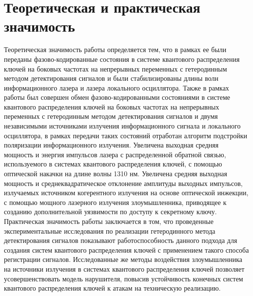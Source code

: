 \section*{Теоретическая и практическая значимость}
Теоретическая значимость работы определяется тем, что в рамках  ее  были переданы фазово-кодированные состояния в системе квантового распределения ключей на боковых частотах на непрерывных переменных с гетеродинным методом детектирования сигналов и были стабилизированы длины волн информационного лазера и лазера локального осциллятора. Также в рамках работы был совершен обмен фазово-кодированными состояниями в системе квантового распределения ключей на боковых частотах на непрерывных переменных с гетеродинным методом детектирования сигналов и двумя независимыми источниками излучения информационного сигнала и локального осциллятора, в рамках передачи таких состояний отработан алгоритм подстройки поляризации информационного излучения. Увеличена выходная средняя мощность и энергия импульсов лазера с распределенной обратной связью, используемого в системах квантового распределения ключей, с помощью оптической накачки на длине волны 1310 нм. Увеличена средняя выходная мощность и среднеквадратическое отклонение амплитуды выходных импульсов, излучаемых источником когерентного излучения на основе оптической инжекции, с помощью мощного лазерного излучения злоумышленника, приводящее к созданию дополнительной уязвимости по доступу к секретному ключу. 
Практическая значимость работы заключается в том, что проведенные экспериментальные исследования по реализации гетеродинного метода детектирования сигналов показывают работоспособность данного подхода для создания систем квантового распределения ключей с применением такого способа регистрации сигналов. Исследованные же методы воздействия злоумышленника на источники излучения в системах квантового распределения ключей позволяет усовершенствовать модель нарушителя, повысив устойчивость конечных систем квантового распределения ключей к атакам на техническую реализацию. 

